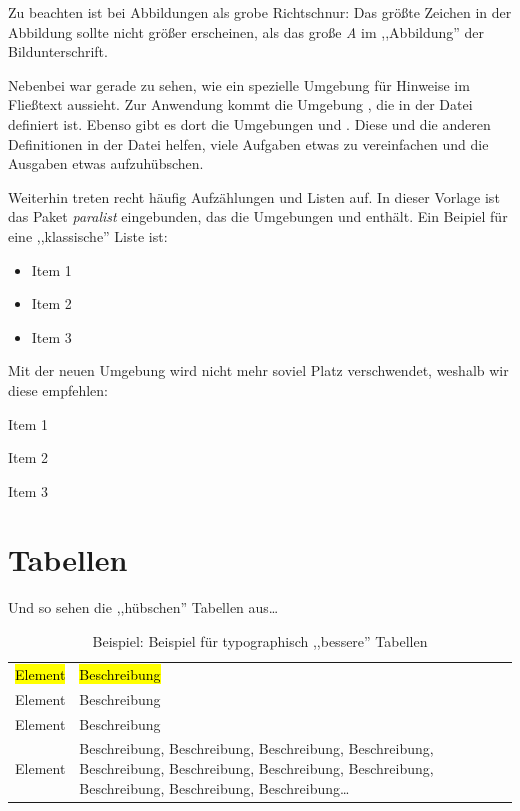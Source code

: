 \begin{MySugg}
	Zu beachten ist bei Abbildungen als grobe Richtschnur: Das gr\"o{\ss}te Zeichen in der Abbildung sollte nicht gr\"o{\ss}er erscheinen, als das gro{\ss}e \emph{A} im ,,Abbildung'' der Bildunterschrift.
\end{MySugg}

Nebenbei war gerade zu sehen, wie ein spezielle Umgebung f\"ur Hinweise im Flie{\ss}text aussieht. Zur Anwendung kommt die Umgebung , die in der Datei  definiert ist. Ebenso gibt es dort die Umgebungen  und . Diese und die anderen Definitionen in der Datei helfen, viele Aufgaben etwas zu vereinfachen und die Ausgaben etwas aufzuh\"ubschen.

Weiterhin treten recht h\"aufig Aufz\"ahlungen und Listen auf. In dieser Vorlage ist das Paket \emph{paralist} eingebunden, das die Umgebungen  und  enth\"alt. Ein Beipiel f\"ur eine ,,klassische'' Liste ist:

\begin{itemize}
	\item Item 1
	\item Item 2
	\item Item 3
\end{itemize}

Mit der neuen Umgebung wird nicht mehr soviel Platz verschwendet, weshalb wir diese empfehlen:


\begin{compactitem}
	\item Item 1
	\item Item 2
	\item Item 3
\end{compactitem}


\section{Tabellen}
\label{sec:Tabellen}
Und so sehen die ,,h\"ubschen'' Tabellen aus\ldots

\begin{table}[htbp]
\begin{tabularx}
	{\linewidth}{@{}!{\color{white}\vrule}>{\hspace{0mm}}lL<{\hspace{0mm}} !{\color{white}\vrule width 0pt}@{}}
	\opentableheader	%
		\hl{Element} & \hl{Beschreibung} \\
	\closetableheader %
		Element & Beschreibung \\
		Element & Beschreibung \\
		\midrule
		Element & Beschreibung, Beschreibung, Beschreibung, Beschreibung, Beschreibung, Beschreibung, Beschreibung, Beschreibung, Beschreibung, Beschreibung, Beschreibung\ldots \\
	\bottomrule
\end{tabularx}
  \caption[Alternativtext f\"ur das Verzeichnis]{Beispiel: Beispiel f\"ur typographisch ,,bessere'' Tabellen}%
  \label{tab:BeschreibungAllgemeinesNamensschema}
\end{table}

